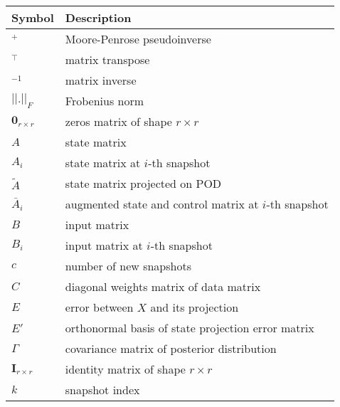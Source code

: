 \begin{longtable}{p{2cm}l}
	\toprule
	\textbf{Symbol}                & \textbf{Description}                                    \\
	\midrule
	\endhead{}
	\(^+\)                         & Moore-Penrose pseudoinverse                             \\
	\(^\top \)                     & matrix transpose                                        \\
	\(^{-1}\)                      & matrix inverse                                          \\
	\(||.||_F\)                    & Frobenius norm                                          \\
	\(\mathbf{0}_{r \times r}\)    & zeros matrix of shape \(r \times r\)                    \\
	\(A\)                          & state matrix                                            \\
	\(A_i\)                        & state matrix at \(i\)-th snapshot                       \\
	\(\tilde{A}\)                  & state matrix projected on POD                           \\
	\(\bar{A}_i\)                  & augmented state and control matrix at \(i\)-th snapshot \\
	\(B\)                          & input matrix                                            \\
	\(B_i\)                        & input matrix at \(i\)-th snapshot                       \\
	\(c\)                          & number of new snapshots                                 \\
	\(C\)                          & diagonal weights matrix of data matrix                  \\
	\(E\)                          & error between \(X\) and its projection                  \\
	\(E'\)                         & orthonormal basis of state projection error matrix      \\
	\(\Gamma \)                    & covariance matrix of posterior distribution             \\
	\(\textbf{I}_{r \times r}\)    & identity matrix of shape \(r \times r\)                 \\
	\(k\)                          & snapshot index                                          \\

\end{longtable}
